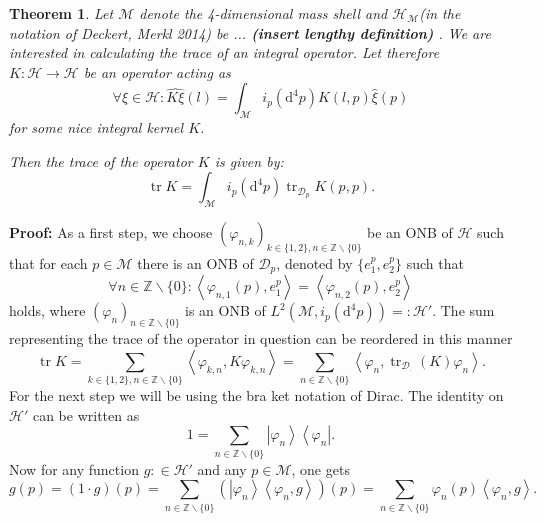 \documentclass[oneside,reqno,12pt]{amsart}
\newtheorem{Thm}[Def]{Theorem}
\DeclareMathOperator{\tr}{tr}
\begin{document}
\begin{Thm}\label{trace_int_op}
 Let \(\mathcal{M}\) denote the 4-dimensional mass shell and \(\mathcal{H}_{\mathcal{M}}\)(in the notation of Deckert, Merkl 2014) be ... {\bf (insert lengthy definition) }. We are interested in calculating the trace of an integral operator. Let therefore \(K: \mathcal{H}\rightarrow \mathcal{H}\) be an operator acting as
\begin{equation}
\forall  \xi  \in \mathcal{H}: \widehat{K\xi} (l)= \int_{\mathcal{M}} i_p \left( \mathrm{d}^4 p \right) K(l,p) \hat{\xi}(p)
\end{equation}
 for some nice integral kernel \(K\). 
 
 Then the trace of the operator \(K\) is given by:
 \begin{equation}
 \tr K= \int_{\mathcal{M}} i_p \left( \mathrm{d}^4 p \right) \tr_{\mathcal{D}_p} K(p,p).
 \end{equation}
 \end{Thm}
 {\bf Proof:} As a first step, we choose \((\varphi_{n,k})_{k\in \{1,2\} ,n\in \mathbb{Z}\backslash\{0\}}\) be an ONB of \(\mathcal{H}\) such that for each \(p\in \mathcal{M}\) there is an ONB of \(\mathcal{D}_p\), denoted by \(\{e^p_1,e^p_2\}\) such that
 \begin{equation*}
\forall n \in \mathbb{Z}\backslash\{0\}: \left<\varphi_{n,1}(p), e^p_1\right>=\left<\varphi_{n,2}(p), e^p_2\right>
 \end{equation*}
holds, where \((\varphi_n)_{n\in\mathbb{Z}\backslash\{0\}}\) is an ONB of \(L^2\left(\mathcal{M}, i_p\left(\mathrm{d}^4p\right)\right)=:\mathcal{H}'\). The sum representing the trace of the operator in question can be reordered in this manner
 \begin{equation*}
 \tr K = \sum_{k\in \{1,2\}, n \in \mathbb{Z}\backslash\{0\}} \left< \varphi_{k,n},K \varphi_{k,n}\right>=\sum_{n\in\mathbb{Z}\backslash \{0\}} \left< \varphi_{n},\tr_{\mathcal{D}_{\cdot}} \left(K\right) \varphi_{n}\right>
 .\end{equation*}
For the next step we will be using the bra ket notation of Dirac. The identity on \(\mathcal{H}'\) can be written as 
\begin{equation*}
1=\sum_{n\in\mathbb{Z}\backslash\{0\}} \left| \varphi_n \right> \left< \varphi_n \right|
.\end{equation*}
Now for any function \(g: \in \mathcal{H}'\) and any \(p\in\mathcal{M}\), one gets
\begin{equation*}
g(p)= (1 \cdot g) (p) = \sum_{n\in\mathbb{Z}\backslash\{0\}}\left( \left| \varphi_n \right> \left< \varphi_n , g \right>\right)(p)= \sum_{n\in\mathbb{Z}\backslash\{0\}} \varphi_n (p) \left< \varphi_n , g \right>
.\end{equation*} 
\end{document}
